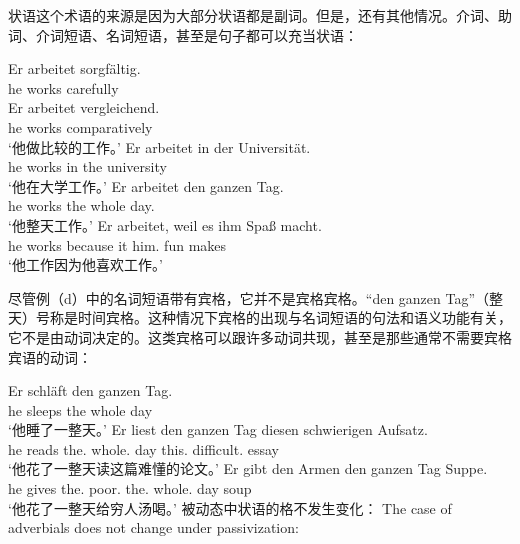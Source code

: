 状语这个术语的来源是因为大部分状语都是副词。但是，还有其他情况。介词、助词、介词短语、名词短语，甚至是句子都可以充当状语：

\eal
\ex 
\gll Er arbeitet sorgfältig.\\
	 he works carefully\\
\ex 
\gll Er arbeitet vergleichend.\\
	 he works comparatively\\
\glt `他做比较的工作。'
\ex 
\gll Er arbeitet in der Universität.\\
	 he works in the university\\
\glt `他在大学工作。'
\ex 
\gll Er arbeitet den ganzen Tag.\\
     he works the whole day.\acc\\
\glt `他整天工作。'
\ex 
\gll Er arbeitet, weil es ihm Spaß macht.\\
	 he works because it him.\dat{} fun makes\\
\glt `他工作因为他喜欢工作。'
\zl

\addlines[2]
\noindent
尽管例（d）中的名词短语带有宾格，它并不是宾格宾格。“den ganzen Tag”（整天）号称是时间宾格。这种情况下宾格的出现与名词短语的句法和语义功能有关，它不是由动词决定的。这类宾格可以跟许多动词共现，甚至是那些通常不需要宾格宾语的动词：

\eal
\ex 
\gll Er schläft den ganzen Tag.\\
     he sleeps the whole day\\
\glt `他睡了一整天。'
\ex 
\gll Er liest den ganzen Tag diesen schwierigen Aufsatz.\\
	 he reads the.\acc{} whole.\acc{} day this.\acc{} difficult.\acc{} essay\\
\glt `他花了一整天读这篇难懂的论文。'
\ex 
\gll Er gibt den Armen den ganzen Tag Suppe.\\
	 he gives the.\dat{} poor.\dat{} the.\acc{} whole.\acc{} day soup\\
\glt `他花了一整天给穷人汤喝。'
\zl
被动态中状语的格不发生变化：
The case of adverbials does not change under passivization:
\eal
{}
\zl
{}

